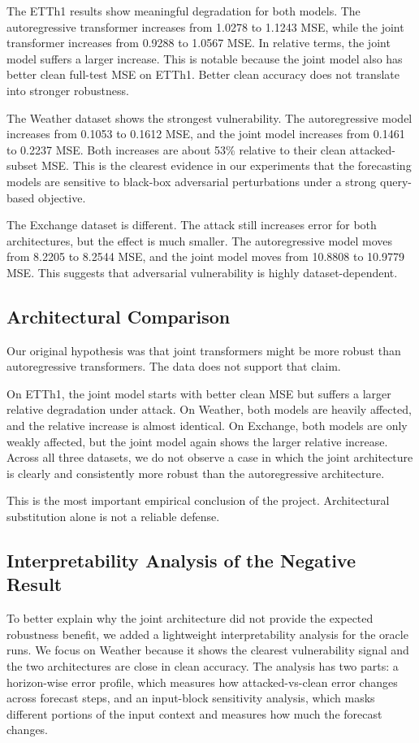 \documentclass[11pt]{article}
\begin{document}
The ETTh1 results show meaningful degradation for both models. The autoregressive transformer increases from 1.0278 to 1.1243 MSE, while the joint transformer increases from 0.9288 to 1.0567 MSE. In relative terms, the joint model suffers a larger increase. This is notable because the joint model also has better clean full-test MSE on ETTh1. Better clean accuracy does not translate into stronger robustness.

The Weather dataset shows the strongest vulnerability. The autoregressive model increases from 0.1053 to 0.1612 MSE, and the joint model increases from 0.1461 to 0.2237 MSE. Both increases are about 53\% relative to their clean attacked-subset MSE. This is the clearest evidence in our experiments that the forecasting models are sensitive to black-box adversarial perturbations under a strong query-based objective.

The Exchange dataset is different. The attack still increases error for both architectures, but the effect is much smaller. The autoregressive model moves from 8.2205 to 8.2544 MSE, and the joint model moves from 10.8808 to 10.9779 MSE. This suggests that adversarial vulnerability is highly dataset-dependent.

\subsection{Architectural Comparison}
Our original hypothesis was that joint transformers might be more robust than autoregressive transformers. The data does not support that claim.

On ETTh1, the joint model starts with better clean MSE but suffers a larger relative degradation under attack. On Weather, both models are heavily affected, and the relative increase is almost identical. On Exchange, both models are only weakly affected, but the joint model again shows the larger relative increase. Across all three datasets, we do not observe a case in which the joint architecture is clearly and consistently more robust than the autoregressive architecture.

This is the most important empirical conclusion of the project. Architectural substitution alone is not a reliable defense.

\subsection{Interpretability Analysis of the Negative Result}
To better explain why the joint architecture did not provide the expected robustness benefit, we added a lightweight interpretability analysis for the oracle runs. We focus on Weather because it shows the clearest vulnerability signal and the two architectures are close in clean accuracy. The analysis has two parts: a horizon-wise error profile, which measures how attacked-vs-clean error changes across forecast steps, and an input-block sensitivity analysis, which masks different portions of the input context and measures how much the forecast changes.
\end{document}
